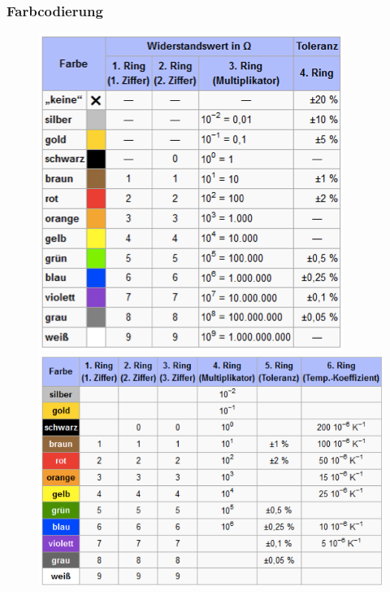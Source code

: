 \subsubsection{Farbcodierung}
\begin{figure}[htbs]
\includegraphics[scale=0.5]{pictures/farbcodierung4}
\includegraphics[scale=0.5]{pictures/farbcodierung6}
\end{figure}
\newpage
